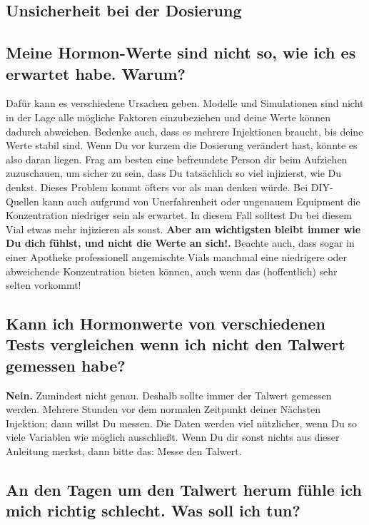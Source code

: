 \documentclass{article}
\begin{document}
{{\subsection*{Unsicherheit bei der Dosierung}

\subsection{Meine Hormon-Werte sind nicht so, wie ich es erwartet habe. Warum?}

Dafür kann es verschiedene Ursachen geben. Modelle und Simulationen sind nicht in der Lage alle mögliche Faktoren einzubeziehen und deine Werte können dadurch abweichen. Bedenke auch, dass es mehrere Injektionen braucht, bis deine Werte stabil sind. Wenn Du vor kurzem die Dosierung verändert hast, könnte es also daran liegen. Frag am besten eine befreundete Person dir beim Aufziehen zuzuschauen, um sicher zu sein, dass Du tatsächlich so viel injizierst, wie Du denkst. Dieses Problem kommt öfters vor als man denken würde. Bei DIY-Quellen kann auch aufgrund von Unerfahrenheit oder ungenauem Equipment die Konzentration niedriger sein als erwartet. In diesem Fall solltest Du bei diesem Vial etwas mehr injizieren als sonst. \textbf{Aber am wichtigsten bleibt immer wie Du dich fühlst, und nicht die Werte an sich!. }Beachte auch, dass sogar in einer Apotheke professionell angemischte Vials manchmal eine niedrigere oder abweichende Konzentration bieten können, auch wenn das (hoffentlich) sehr selten vorkommt!

\subsection{Kann ich Hormonwerte von verschiedenen Tests vergleichen wenn ich nicht den Talwert gemessen habe?}

\textbf{Nein.} Zumindest nicht genau. Deshalb sollte immer der Talwert gemessen werden. Mehrere Stunden vor dem normalen Zeitpunkt deiner Nächsten Injektion; dann willst Du messen. Die Daten werden viel nützlicher, wenn Du so viele Variablen wie möglich ausschließt. Wenn Du dir sonst nichts aus dieser Anleitung merkst, dann bitte das: Messe den Talwert.

\subsection{An den Tagen um den Talwert herum fühle ich mich richtig schlecht. Was soll ich tun?}\label{7-3}

}}
\end{document}
